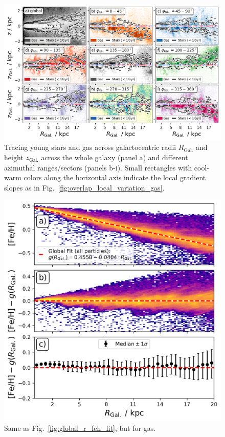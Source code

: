 \documentclass[fleqn,usenatbib]{mnras}
\begin{document}
\begin{figure}
    \centering
    \includegraphics[width=\columnwidth]{figures/tracing_young_stars_and_gas_in_angles.png}
    \caption{Tracing young stars and gas across galactocentric radii $R_\mathrm{Gal.}$ and height $z_\mathrm{Gal.}$ across the whole galaxy (panel a) and different azimuthal ranges/sectors (panels b-i). Small rectangles with cool-warm colors along the horizontal axis indicate the local gradient slopes as in Fig.~\ref{fig:overlap_local_variation_gas}.}
    \label{fig:tracing_young_stars_and_gas_in_angles}
\end{figure}

\begin{figure}
    \centering
    \includegraphics[width=\columnwidth]{figures/global_r_feh_fit_gas.png}
    \caption{Same as Fig.~\ref{fig:global_r_feh_fit}, but for gas.}
    \label{fig:global_r_feh_fit_gas}
\end{figure}
\end{document}
